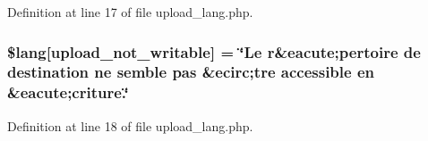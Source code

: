 Definition at line 17 of file upload\+\_\+lang.\+php.

\subsubsection[{\texorpdfstring{\$lang}{$lang}}]{\setlength{\rightskip}{0pt plus 5cm}\$lang\mbox{[}\textquotesingle{}upload\+\_\+not\+\_\+writable\textquotesingle{}\mbox{]} = \char`\"{}Le {\bf r}\&eacute;pertoire de destination ne semble pas \&ecirc;tre accessible en \&eacute;criture.\char`\"{}}\hypertarget{application_2language_2french_2upload__lang_8php_aed6bfb5a9094179427f61fcbb582145b}{}\label{application_2language_2french_2upload__lang_8php_aed6bfb5a9094179427f61fcbb582145b}


Definition at line 18 of file upload\+\_\+lang.\+php.

